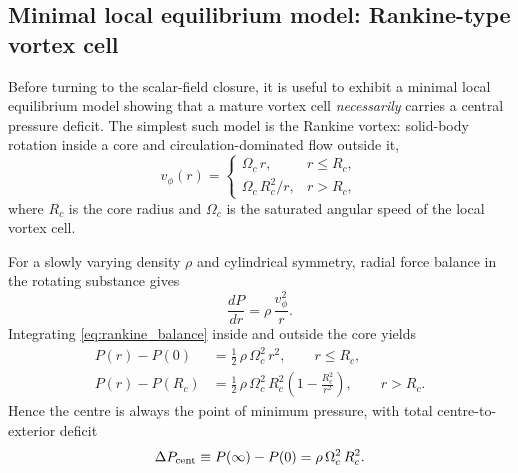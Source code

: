 \documentclass[11pt]{article}
\begin{document}
\subsection{Minimal local equilibrium model: Rankine-type vortex cell}
\label{sec:rankine_vortex}

Before turning to the scalar-field closure, it is useful to exhibit a
minimal local equilibrium model showing that a mature vortex cell
\emph{necessarily} carries a central pressure deficit.  The simplest such
model is the Rankine vortex: solid-body rotation inside a core and
circulation-dominated flow outside it,
\begin{equation}
v_\phi(r)=
\begin{cases}
\Omega_c\,r, & r\le R_c,\\[4pt]
\Omega_c\,R_c^2/r, & r>R_c,
\end{cases}
\label{eq:rankine_profile}
\end{equation}
where $R_c$ is the core radius and $\Omega_c$ is the saturated angular
speed of the local vortex cell.

For a slowly varying density $\rho$ and cylindrical symmetry, radial force
balance in the rotating substance gives
\begin{equation}
\frac{dP}{dr}=\rho\,\frac{v_\phi^2}{r}.
\label{eq:rankine_balance}
\end{equation}
Integrating \eqref{eq:rankine_balance} inside and outside the core yields
\begin{align}
P(r)-P(0)
&= \frac12\,\rho\,\Omega_c^2\,r^2,
\qquad r\le R_c,
\label{eq:rankine_pressure_inner}
\\[4pt]
P(r)-P(R_c)
&= \frac12\,\rho\,\Omega_c^2\,R_c^2
\left(1-\frac{R_c^2}{r^2}\right),
\qquad r>R_c.
\label{eq:rankine_pressure_outer}
\end{align}
Hence the centre is always the point of minimum pressure, with total
centre-to-exterior deficit
\begin{equation}
\Delta P_{\rm cent}
\equiv P(\infty)-P(0)
= \rho\,\Omega_c^2\,R_c^2.
\label{eq:rankine_center_deficit}
\end{equation}
\end{document}
